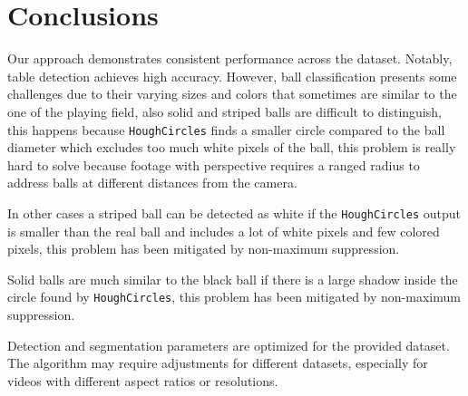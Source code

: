 \section{Conclusions}
Our approach demonstrates consistent performance across the dataset. Notably, table detection achieves high accuracy.
However, ball classification presents some challenges due to their varying sizes and colors that sometimes are similar to the one of the playing field, also solid and striped balls are difficult to distinguish, this happens because \texttt{HoughCircles} finds a smaller circle compared to the ball diameter which excludes too much white pixels of the ball, this problem is really hard to solve because footage with perspective requires a ranged radius to address balls at different distances from the camera.

In other cases a striped ball can be detected as white if the \texttt{HoughCircles} output is smaller than the real ball and includes a lot of white pixels and few colored pixels, this problem has been mitigated by non-maximum suppression.

Solid balls are much similar to the black ball if there is a large shadow inside the circle found by \texttt{HoughCircles}, this problem has been mitigated by non-maximum suppression.


Detection and segmentation parameters are optimized for the provided dataset. The algorithm may require adjustments for different datasets, especially for videos with different aspect ratios or resolutions.

